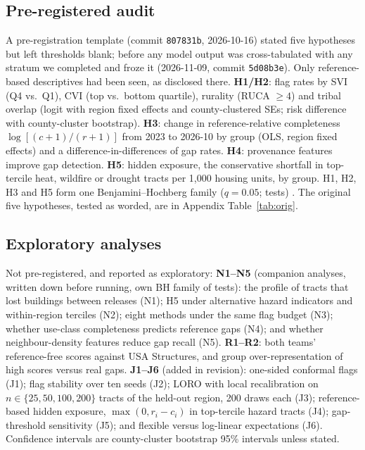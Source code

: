 \documentclass[11pt]{article}
\begin{document}
\subsection{Pre-registered audit}
A pre-registration template (commit \texttt{807831b}, 2026-10-16) stated five hypotheses but left thresholds blank; before any model output was cross-tabulated with any stratum we completed and froze it (2026-11-09, commit \texttt{5d08b3e}). Only reference-based descriptives had been seen, as disclosed there. \textbf{H1/H2}: flag rates by SVI (Q4 vs.\ Q1), CVI (top vs.\ bottom quartile), rurality (RUCA $\geq 4$) and tribal overlap (logit with region fixed effects and county-clustered SEs; risk difference with county-cluster bootstrap). \textbf{H3}: change in reference-relative completeness $\log[(c+1)/(r+1)]$ from 2023 to 2026-10 by group (OLS, region fixed effects) and a difference-in-differences of gap rates. \textbf{H4}: provenance features improve gap detection. \textbf{H5}: hidden exposure, the conservative shortfall in top-tercile heat, wildfire or drought tracts per 1,000 housing units, by group. H1, H2, H3 and H5 form one Benjamini--Hochberg family ($q=0.05$; \NFdrFamily{} tests) \citep{bh1995}. The original five hypotheses, tested as worded, are in Appendix Table~\ref{tab:orig}.

\subsection{Exploratory analyses}\label{sec:merged-methods}
Not pre-registered, and reported as exploratory:
\textbf{N1--N5} (companion analyses, written down before running, own BH family of \MgNFam{} tests): the profile of tracts that lost buildings between releases (N1); H5 under alternative hazard indicators and within-region terciles (N2); eight methods under the same flag budget (N3); whether use-class completeness predicts reference gaps (N4); and whether neighbour-density features reduce gap recall (N5).
\textbf{R1--R2}: both teams' reference-free scores against USA Structures, and group over-representation of high scores versus real gaps.
\textbf{J1--J6} (added in revision): one-sided conformal flags (J1); flag stability over ten seeds (J2); LORO with local recalibration on $n\in\{25,50,100,200\}$ tracts of the held-out region, 200 draws each (J3); reference-based hidden exposure, $\max(0, r_i-c_i)$ in top-tercile hazard tracts (J4); gap-threshold sensitivity (J5); and flexible versus log-linear expectations (J6). Confidence intervals are county-cluster bootstrap 95\% intervals unless stated.
\end{document}
